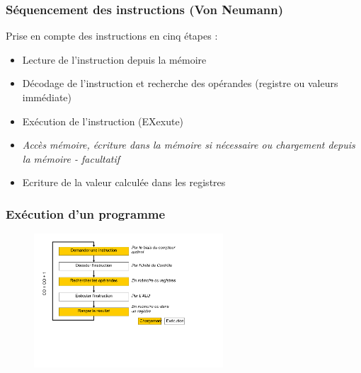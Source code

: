 \begin{frame}
\frametitle{Séquencement des instructions (Von Neumann)}
Prise en compte des instructions en cinq étapes :
\begin{itemize}
\item <1>[IF \footnote{Instruction \texttt{Fetch}}] Lecture de l'instruction depuis la mémoire
\item <2>[ID\footnote{Instruction \texttt{Decoding}}] Décodage de l'instruction et recherche des opérandes (registre ou valeurs immédiate)
\item <3>[EX] Exécution de l'instruction (EXexute)
\item <4>[\textit{MEM}] \textit{Accès mémoire, écriture dans la mémoire si nécessaire ou chargement depuis la mémoire - facultatif}
\item <5>[WB\footnote{\texttt{Write Back}}] Ecriture de la valeur calculée dans les registres
\end{itemize}
\end{frame}



\begin{frame}
\frametitle{Exécution d'un programme}
\begin{figure}[htbp]
\includegraphics[height=5cm]{../illustration/exec_pgm.pdf}
\end{figure}
\end{frame}

